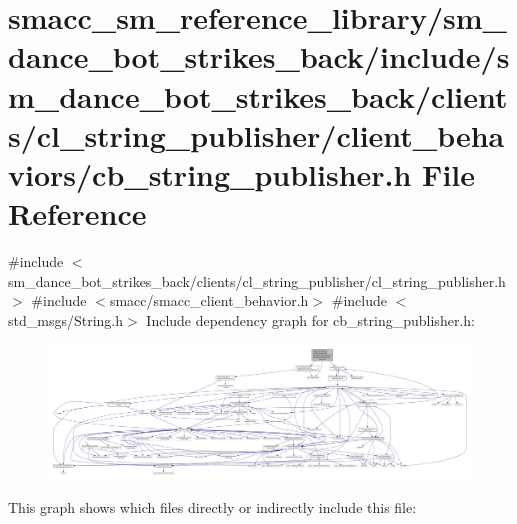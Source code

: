 \hypertarget{sm__dance__bot__strikes__back_2include_2sm__dance__bot__strikes__back_2clients_2cl__string__publ2c65f6b51afab33732c07df2f6c50617}{}\section{smacc\+\_\+sm\+\_\+reference\+\_\+library/sm\+\_\+dance\+\_\+bot\+\_\+strikes\+\_\+back/include/sm\+\_\+dance\+\_\+bot\+\_\+strikes\+\_\+back/clients/cl\+\_\+string\+\_\+publisher/client\+\_\+behaviors/cb\+\_\+string\+\_\+publisher.h File Reference}
\label{sm__dance__bot__strikes__back_2include_2sm__dance__bot__strikes__back_2clients_2cl__string__publ2c65f6b51afab33732c07df2f6c50617}
{\ttfamily \#include $<$sm\+\_\+dance\+\_\+bot\+\_\+strikes\+\_\+back/clients/cl\+\_\+string\+\_\+publisher/cl\+\_\+string\+\_\+publisher.\+h$>$}\newline
{\ttfamily \#include $<$smacc/smacc\+\_\+client\+\_\+behavior.\+h$>$}\newline
{\ttfamily \#include $<$std\+\_\+msgs/\+String.\+h$>$}\newline
Include dependency graph for cb\+\_\+string\+\_\+publisher.\+h\+:
\nopagebreak
\begin{figure}[H]
\begin{center}
\leavevmode
\includegraphics[width=350pt]{sm__dance__bot__strikes__back_2include_2sm__dance__bot__strikes__back_2clients_2cl__string__publ6332970db3f7a29f4ec3ebd9f806a5ae}
\end{center}
\end{figure}
This graph shows which files directly or indirectly include this file\+:
\nopagebreak
